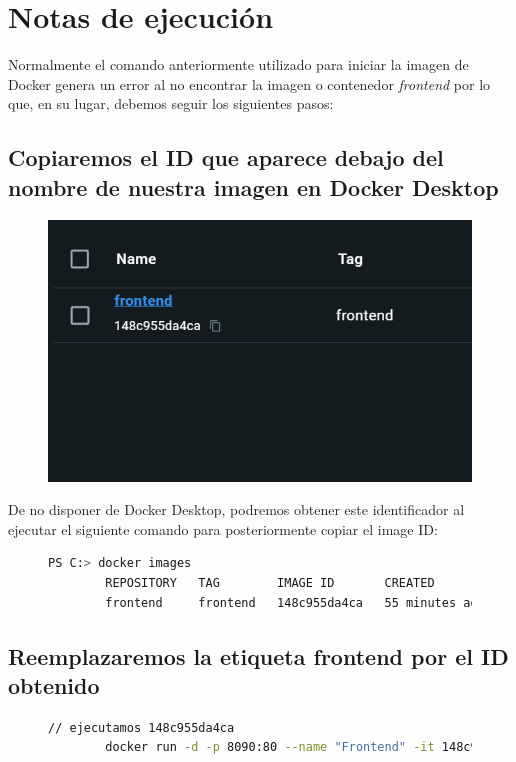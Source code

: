 \documentclass[11pt,a4paper]{article}
\begin{document}
\section{Notas de ejecución}
Normalmente el comando anteriormente utilizado para iniciar la imagen de Docker 
genera un error al no encontrar la imagen o contenedor \textit{frontend} por lo que, 
en su lugar, debemos seguir los siguientes pasos:\par

\subsection{Copiaremos el ID que aparece debajo del nombre de nuestra imagen en Docker Desktop}
\begin{figure}[h]
    \centerline{\includegraphics{images/img001.png}}
\end{figure}

\par
De no disponer de Docker Desktop, podremos obtener este identificador
al ejecutar el siguiente comando para posteriormente copiar el image ID:

\begin{figure}[h]
    \begin{lstlisting}[language=Bash]
        PS C:> docker images
        REPOSITORY   TAG        IMAGE ID       CREATED          SIZE
        frontend     frontend   148c955da4ca   55 minutes ago   195MB
    \end{lstlisting}
\end{figure}

\newpage

\subsection{Reemplazaremos la etiqueta frontend por el ID obtenido}

\begin{figure}[h]
    \begin{lstlisting}[language=Bash]
        // ejecutamos 148c955da4ca
        docker run -d -p 8090:80 --name "Frontend" -it 148c955da4ca nginx -g "daemon off;"
    \end{lstlisting}
\end{figure}

\end{document}
